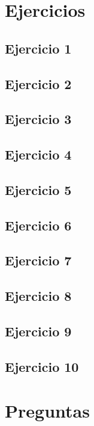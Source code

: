 \documentclass{aitemplate}
\begin{document}
\section{Ejercicios}\subsection*{Ejercicio 1}
\newpage\subsection*{Ejercicio 2}
\newpage\subsection*{Ejercicio 3}
\newpage\subsection*{Ejercicio 4}
\newpage\subsection*{Ejercicio 5}
\newpage\subsection*{Ejercicio 6}
\newpage\subsection*{Ejercicio 7}
\newpage\subsection*{Ejercicio 8}
\newpage\subsection*{Ejercicio 9}
\newpage\subsection*{Ejercicio 10}
\newpage\section{Preguntas}
\end{document}
